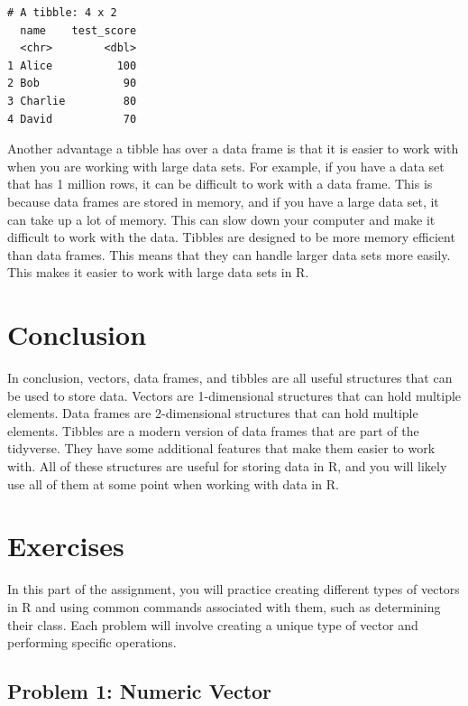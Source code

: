 \documentclass[
  letterpaper,
  DIV=11,
  numbers=noendperiod]{scrreprt}
\begin{document}
\begin{verbatim}
# A tibble: 4 x 2
  name    test_score
  <chr>        <dbl>
1 Alice          100
2 Bob             90
3 Charlie         80
4 David           70
\end{verbatim}

Another advantage a tibble has over a data frame is that it is easier to
work with when you are working with large data sets. For example, if you
have a data set that has 1 million rows, it can be difficult to work
with a data frame. This is because data frames are stored in memory, and
if you have a large data set, it can take up a lot of memory. This can
slow down your computer and make it difficult to work with the data.
Tibbles are designed to be more memory efficient than data frames. This
means that they can handle larger data sets more easily. This makes it
easier to work with large data sets in R.

\section*{Conclusion}\label{conclusion-2}


In conclusion, vectors, data frames, and tibbles are all useful
structures that can be used to store data. Vectors are 1-dimensional
structures that can hold multiple elements. Data frames are
2-dimensional structures that can hold multiple elements. Tibbles are a
modern version of data frames that are part of the tidyverse. They have
some additional features that make them easier to work with. All of
these structures are useful for storing data in R, and you will likely
use all of them at some point when working with data in R.

\section*{Exercises}\label{exercises-8}


In this part of the assignment, you will practice creating different
types of vectors in R and using common commands associated with them,
such as determining their class. Each problem will involve creating a
unique type of vector and performing specific operations.

\subsection*{Problem 1: Numeric Vector}\label{problem-1-numeric-vector}
\end{document}
